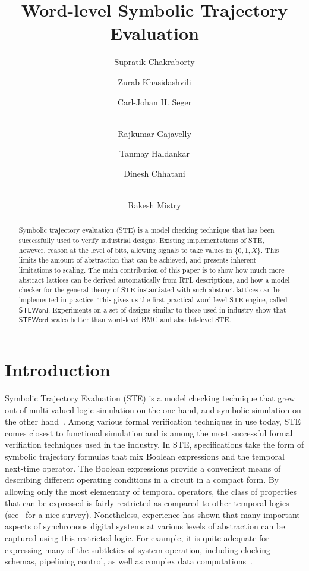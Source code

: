 \documentclass{llncs}
\newcommand{\steword}{\ensuremath{\mathsf{STEWord}}}
\begin{document}
\title{Word-level Symbolic Trajectory Evaluation}

\author{Supratik Chakraborty \and 
Zurab Khasidashvili \and 
Carl-Johan H. Seger \and \\
Rajkumar Gajavelly \and
Tanmay Haldankar \and 
Dinesh Chhatani \and \\
Rakesh Mistry}

\maketitle

\begin{abstract}
Symbolic trajectory evaluation (STE) is a model checking technique
that has been successfully used to verify industrial designs.
Existing implementations of STE, however, reason at the level of bits,
allowing signals to take values in $\{0, 1, X\}$.  This limits the
amount of abstraction that can be achieved, and presents inherent
limitations to scaling.  The main contribution of this paper is to
show how much more abstract lattices can be derived automatically from
RTL descriptions, and how a model checker for the general theory of
STE instantiated with such abstract lattices can be implemented in
practice.  This gives us the first practical word-level STE engine,
called {\steword}.  Experiments on a set of designs similar to those
used in industry show that {\steword} scales better than
word-level BMC and also bit-level STE.
\end{abstract}

\section{Introduction}


Symbolic Trajectory Evaluation (STE) is a model checking technique
that grew out of multi-valued logic simulation on the one hand, and
symbolic simulation on the other hand~\cite{BryantSeger90}.  Among
various formal verification techniques in use today, STE comes closest
to functional simulation and is among the most successful formal
verifiation techniques used in the industry.  In STE, specifications
take the form of symbolic trajectory formulas that mix Boolean
expressions and the temporal next-time operator.  The Boolean
expressions provide a convenient means of describing different
operating conditions in a circuit in a compact form.  By allowing only
the most elementary of temporal operators, the class of properties
that can be expressed is fairly restricted as compared to other
temporal logics (see~\cite{Emerson95} for a nice survey).
Nonetheless, experience has shown that many important aspects of
synchronous digital systems at various levels of abstraction can be
captured using this restricted logic.  For example, it is quite
adequate for expressing many of the subtleties of system operation,
including clocking schemas, pipelining control, as well as complex
data
computations~\cite{SegerJOMABS05,KumarGuptaGhughal12,KaivolaEtAl09}.
\end{document}
